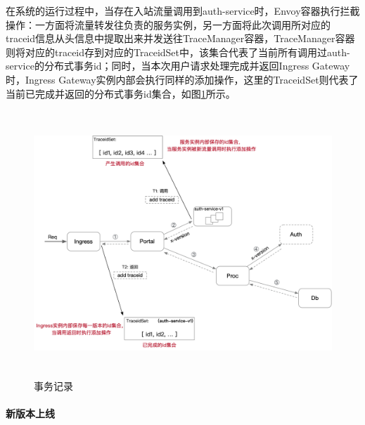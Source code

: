 \documentclass[a4paper, 12pt]{article}
\theoremstyle{definition}
\begin{document}
在系统的运行过程中，当存在入站流量调用到auth-service时，Envoy容器执行拦截操作：一方面将流量转发往负责的服务实例，另一方面将此次调用所对应的traceid信息从头信息中提取出来并发送往TraceManager容器，TraceManager容器则将对应的traceid存到对应的TraceidSet中，该集合代表了当前所有调用过auth-service的分布式事务id；同时，当本次用户请求处理完成并返回Ingress Gateway时，Ingress Gateway实例内部会执行同样的添加操作，这里的TraceidSet则代表了当前已完成并返回的分布式事务id集合，如图\ref{fig:record_trace}所示。
\begin{figure}[!ht]
 \centering
 \includegraphics[height=10cm]{images/record_trace.png}
 \caption{事务记录}
 \label{fig:record_trace}
\end{figure}

\paragraph{新版本上线}\mbox{}\\
\end{document}
